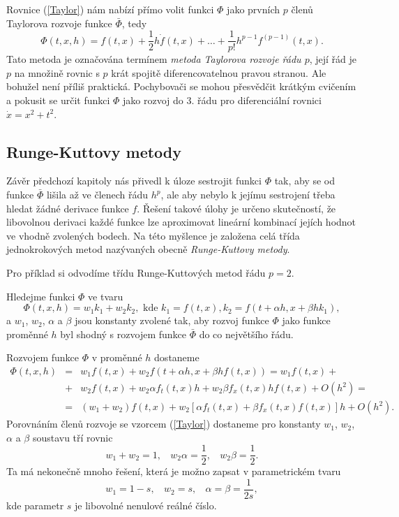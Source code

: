 \documentclass[a4paper, 12pt]{book}
\theoremstyle{definition}
\begin{document}
Rovnice (\ref{Taylor}) nám nabízí přímo volit funkci $\Phi$ jako prvních $p$ členů
Taylorova rozvoje funkce $\bar\Phi$, tedy
\begin{displaymath}
\Phi(t,x,h) = f(t,x)+ \frac{1}{2}h\dot f(t,x)+\dots+\frac{1}{p!}h^{p-1}f^{(p-1)}(t,x).
\end{displaymath}
Tato metoda je označována termínem {\em metoda Taylorova rozvoje řádu $p$}, její řád
je $p$ na množině rovnic s $p$ krát spojitě diferencovatelnou pravou stranou. Ale
bohužel není příliš praktická. Pochybovači se mohou přesvědčit krátkým cvičením a 
pokusit se určit funkci $\Phi$ jako rozvoj do 3. řádu pro diferenciální rovnici 
$\dot x=x^2 + t^2$.

\subsection{Runge-Kuttovy metody}
Závěr předchozí kapitoly nás přivedl k úloze sestrojit funkci $\Phi$ tak, aby se od
funkce $\bar\Phi$ lišila až ve členech řádu $h^p$, ale aby nebylo k jejímu sestrojení 
třeba hledat žádné derivace funkce $f$. Řešení takové úlohy je určeno skutečností,
že libovolnou derivaci každé funkce lze aproximovat lineární kombinací jejích hodnot 
ve vhodně zvolených bodech. Na této myšlence je založena celá třída jednokrokových 
metod nazývaných obecně {\em Runge-Kuttovy metody}.

Pro příklad si odvodíme třídu Runge-Kuttových metod řádu $p=2$.

Hledejme funkci $\Phi$ ve tvaru 
\begin{displaymath}
\Phi(t,x,h)=w_1k_1+w_2k_2,\mbox{ kde~} k_1=f(t,x), k_2=f(t+\alpha h,x+\beta h k_1),
\end{displaymath}
a $w_1$, $w_2$, $\alpha$ a $\beta$ jsou konstanty zvolené tak, aby rozvoj funkce 
$\Phi$ jako funkce proměnné $h$ byl shodný s rozvojem funkce $\bar\Phi$ do co 
největšího řádu.

Rozvojem funkce $\Phi$ v proměnné $h$ dostaneme
\begin{eqnarray*}
\Phi(t,x,h)\!&\!=\!&\! w_1 f(t,x)+ w_2 f(t+\alpha h,x+\beta h f(t,x))=w_1 f(t,x)+ \\
&\!+\!&\! w_2 f(t,x)+ w_2\alpha f_t(t,x) h+w_2\beta f_x(t,x)hf(t,x)+ O(h^2)=\\
&\!=\!&\! (w_1+w_2) f(t,x)+ w_2[\alpha f_t(t,x)+ \beta f_x(t,x)f(t,x)]h+O(h^2).
\end{eqnarray*}
Porovnáním členů rozvoje se vzorcem (\ref{Taylor}) dostaneme pro konstanty
$w_1$, $w_2$, $\alpha$ a $\beta$ soustavu tří rovnic
\begin{displaymath}
w_1+w_2=1,~~~~w_2 \alpha=\frac 12,~~~~w_2\beta=\frac 12.
\end{displaymath}
Ta má nekonečně mnoho řešení, která je možno zapsat v parametrickém tvaru
\begin{equation}\label{RKmet2r}
w_1=1-s,~~~~w_2=s,~~~~\alpha=\beta=\frac 1{2s},
\end{equation}
kde parametr $s$ je libovolné nenulové reálné číslo.
\end{document}
